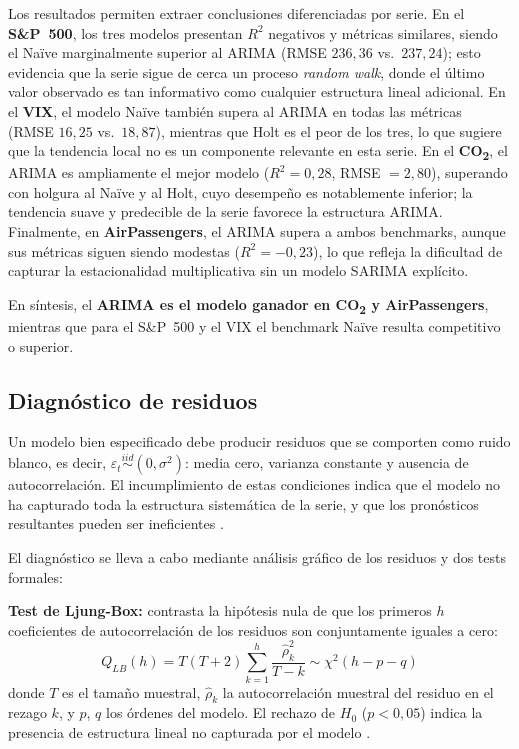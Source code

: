 \documentclass[12pt, a4paper]{article}
\begin{document}
Los resultados permiten extraer conclusiones diferenciadas por serie. En el \textbf{S\&P~500}, los tres modelos presentan $R^2$ negativos y métricas similares, siendo el Naïve marginalmente superior al ARIMA (RMSE $236{,}36$ vs.\ $237{,}24$); esto evidencia que la serie sigue de cerca un proceso \textit{random walk}, donde el último valor observado es tan informativo como cualquier estructura lineal adicional. En el \textbf{VIX}, el modelo Naïve también supera al ARIMA en todas las métricas (RMSE $16{,}25$ vs.\ $18{,}87$), mientras que Holt es el peor de los tres, lo que sugiere que la tendencia local no es un componente relevante en esta serie. En el \textbf{CO\textsubscript{2}}, el ARIMA es ampliamente el mejor modelo ($R^2 = 0{,}28$, RMSE $= 2{,}80$), superando con holgura al Naïve y al Holt, cuyo desempeño es notablemente inferior; la tendencia suave y predecible de la serie favorece la estructura ARIMA. Finalmente, en \textbf{AirPassengers}, el ARIMA supera a ambos benchmarks, aunque sus métricas siguen siendo modestas ($R^2 = -0{,}23$), lo que refleja la dificultad de capturar la estacionalidad multiplicativa sin un modelo SARIMA explícito.

En síntesis, el \textbf{ARIMA es el modelo ganador en CO\textsubscript{2} y AirPassengers}, mientras que para el S\&P~500 y el VIX el benchmark Naïve resulta competitivo o superior.

\subsection{Diagnóstico de residuos}

Un modelo bien especificado debe producir residuos que se comporten como ruido blanco, es decir, $\varepsilon_t \overset{iid}{\sim}(0,\sigma^2)$: media cero, varianza constante y ausencia de autocorrelación. El incumplimiento de estas condiciones indica que el modelo no ha capturado toda la estructura sistemática de la serie, y que los pronósticos resultantes pueden ser ineficientes \cite{box2008}.

El diagnóstico se lleva a cabo mediante análisis gráfico de los residuos y dos tests formales:

\textbf{Test de Ljung-Box:} contrasta la hipótesis nula de que los primeros $h$ coeficientes de autocorrelación de los residuos son conjuntamente iguales a cero:
$$Q_{LB}(h) = T(T+2)\sum_{k=1}^{h}\frac{\hat{\rho}_k^2}{T-k} \sim \chi^2(h-p-q)$$
donde $T$ es el tamaño muestral, $\hat{\rho}_k$ la autocorrelación muestral del residuo en el rezago $k$, y $p$, $q$ los órdenes del modelo. El rechazo de $H_0$ ($p < 0{,}05$) indica la presencia de estructura lineal no capturada por el modelo \cite{cryer2008}.
\end{document}
